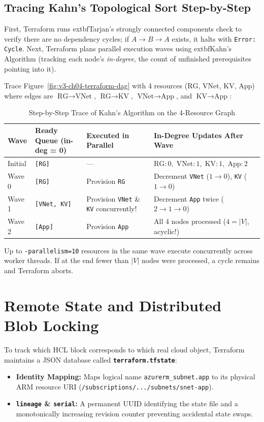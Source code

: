 \subsection{Tracing Kahn's Topological Sort Step-by-Step}
First, Terraform runs 	extbf{Tarjan's strongly connected components check} to verify there are no dependency cycles; if $A \to B \to A$ exists, it halts with \texttt{Error: Cycle}. Next, Terraform plans parallel execution waves using 	extbf{Kahn's Algorithm} (tracking each node's \emph{in-degree}, the count of unfinished prerequisites pointing into it).

Trace Figure~\ref{fig:v3-ch04-terraform-dag} with 4 resources ($\text{RG}$, $\text{VNet}$, $\text{KV}$, $\text{App}$) where edges are $\text{RG} \to \text{VNet}$, $\text{RG} \to \text{KV}$, $\text{VNet} \to \text{App}$, and $\text{KV} \to \text{App}$:

\begin{table}[htbp]
\centering\small
\begin{tabular}{llp{4.6cm}p{4.8cm}}
\toprule
\textbf{Wave} & \textbf{Ready Queue (in-deg = 0)} & \textbf{Executed in Parallel} & \textbf{In-Degree Updates After Wave} \\
\midrule
Initial & \texttt{[RG]} & --- & $\text{RG}:0,\; \text{VNet}:1,\; \text{KV}:1,\; \text{App}:2$ \\
Wave 0 & \texttt{[RG]} & Provision \texttt{RG} & Decrement \texttt{VNet} ($1\to 0$), \texttt{KV} ($1\to 0$) \\
Wave 1 & \texttt{[VNet, KV]} & Provision \texttt{VNet} \& \texttt{KV} concurrently! & Decrement \texttt{App} twice ($2\to 1\to 0$) \\
Wave 2 & \texttt{[App]} & Provision \texttt{App} & All 4 nodes processed ($4 = |V|$, acyclic!) \\
\bottomrule
\end{tabular}
\caption{Step-by-Step Trace of Kahn's Algorithm on the 4-Resource Graph}
\label{tab:v3-ch04-kahn-trace}
\end{table}

Up to \texttt{-parallelism=10} resources in the same wave execute concurrently across worker threads. If at the end fewer than $|V|$ nodes were processed, a cycle remains and Terraform aborts.

\section{Remote State and Distributed Blob Locking}

To track which HCL block corresponds to which real cloud object, Terraform maintains a JSON database called \textbf{\texttt{terraform.tfstate}}:
\begin{itemize}[leftmargin=12pt]
  \item \textbf{Identity Mapping:} Maps logical name \texttt{azurerm\_subnet.app} to its physical ARM resource URI (\texttt{/subscriptions/.../subnets/snet-app}).
  \item \textbf{\texttt{lineage} \& \texttt{serial}:} A permanent UUID identifying the state file and a monotonically increasing revision counter preventing accidental state swaps.
\end{itemize}

